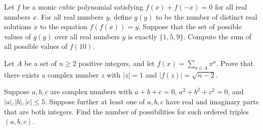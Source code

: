 %	



\begin{question}[name={2021 HMMT, Algebra \& Number Theory, \href{https://artofproblemsolving.com/community/c4p22157502}{Problem 9}}]
	Let $f$ be a monic cubic polynomial satisfying $f(x) + f(-x) = 0$ for all real numbers $x$. For all real numbers $y$, define $g(y)$ to be the number of distinct real solutions $x$ to the equation $f(f(x)) = y$. Suppose that the set of possible values of $g(y)$ over all real numbers $y$ is exactly $\{1, 5, 9\}$. Compute the sum of all possible values of $f(10)$.
\end{question}


%	



\begin{question}[name={2021 HMIC, \href{https://artofproblemsolving.com/community/c4p21784600}{Problem 3}}]
	Let $A$ be a set of $n\ge2$ positive integers, and let $\textstyle f(x)=\sum_{a\in A}x^a$. Prove that there exists a complex number $z$ with $\lvert z\rvert=1$ and $\lvert f(z)\rvert=\sqrt{n-2}$.
\end{question}



%	







\begin{question}[name={2021-22 CHMMC Winter, Team Round, \href{https://artofproblemsolving.com/community/c126h2825790p24985973}{Problem 3}}]
	Suppose $a, b, c$ are complex numbers with $a + b + c = 0$, $a^2 + b^2 + c^2 = 0$, and $|a|,|b|,|c| \le 5$. Suppose further at least one of $a, b, c$ have real and imaginary parts that are both integers. Find the number of possibilities for such ordered triples $(a, b, c)$.	
\end{question}




%	





